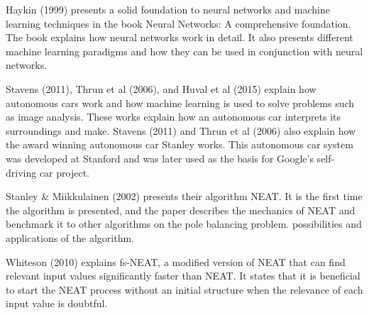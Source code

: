 Haykin (1999) presents a solid foundation to neural networks and machine learning techniques in the book Neural Networks: A comprehensive foundation.
The book explains how neural networks work in detail. It also presents different machine learning paradigms and how they can be used in conjunction with neural networks. 

Stavens (2011), Thrun et al (2006), and Huval et al (2015) explain how autonomous cars work and how machine learning is used to solve problems such as image analysis. These works explain how an autonomous car interprets its surroundings and make. Stavens (2011) and Thrun et al (2006) also explain how the award winning autonomous car Stanley works. This autonomous car system was developed at Stanford and was later used as the basis for Google's self-driving car project.

Stanley \& Miikkulainen (2002) presents their algorithm NEAT. It is the first time the algorithm is presented, and the paper describes the mechanics of NEAT and benchmark it to other algorithms on the pole balancing problem.  possibilities and applications of the algorithm.

Whiteson (2010) explains fs-NEAT, a modified version of NEAT that can find relevant input values significantly faster than NEAT. It states that it is beneficial to start the NEAT process without an initial structure when the relevance of each input value is doubtful.







